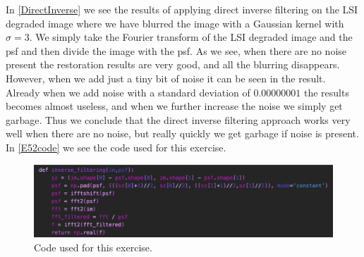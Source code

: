 In \autoref{DirectInverse} we see the results of applying direct inverse filtering on the LSI degraded image where we have blurred the image with a Gaussian kernel with $\sigma = 3$. We simply take the Fourier transform of the LSI degraded image and the psf and then divide the image with the psf. As we see, when there are no noise present the restoration results are very good, and all the blurring disappears. However, when we add just a tiny bit of noise it can be seen in the result. Already when we add noise with a standard deviation of $0.00000001$ the results becomes almost useless, and when we further increase the noise we simply get garbage. Thus we conclude that the direct inverse filtering approach works very well when there are no noise, but really quickly we get garbage if noise is present. In \autoref{E52code} we see the code used for this exercise.
\begin{figure}[H]
	\centering
	\includegraphics[width=\linewidth]{Materials/E5/E52code}
	\caption{Code used for this exercise.}
	\label{E52code}
\end{figure}

